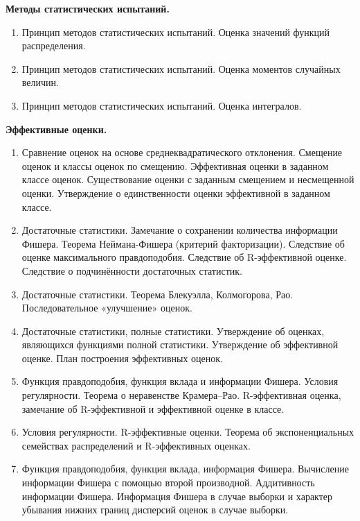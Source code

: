 \documentclass[a4paper,12pt]{article}
\newcommand{\theme}[1]{\hfil \textbf{#1} \hfil}
\begin{document}
\theme{Методы статистических испытаний.}
\begin{enumerate}[resume]
    \item \label{mc:cdf} Принцип методов статистических испытаний. Оценка значений функций распределения.
    \item \label{mc:mom} Принцип методов статистических испытаний. Оценка моментов случайных величин.
    \item \label{mc:int} Принцип методов статистических испытаний. Оценка интегралов.
\end{enumerate}

\theme{Эффективные оценки.}
\begin{enumerate}[resume]
    \item \label{eff:comp} Сравнение оценок на основе среднеквадратического отклонения. Смещение оценок и классы оценок по смещению. Эффективная оценки в заданном классе оценок. Существование оценки с заданным смещением и несмещенной оценки. Утверждение о единственности оценки эффективной в заданном классе.
    \item \label{eff:fact} Достаточные статистики. Замечание о сохранении количества информации Фишера. Теорема Неймана-Фишера (критерий факторизации). Следствие об оценке максимального правдоподобия. Следствие об R-эффективной оценке. Следствие о подчинённости достаточных статистик.
    \item \label{eff:BKR} Достаточные статистики. Теорема Блекуэлла, Колмогорова, Рао. Последовательное «улучшение» оценок.
    \item \label{eff:est} Достаточные статистики, полные статистики. Утверждение об оценках, являющихся функциями полной статистики. Утверждение об эффективной оценке. План построения эффективных оценок.
    \item \label{eff:CR} Функция правдоподобия, функция вклада и информации Фишера. Условия регулярности. Теорема о неравенстве Крамера--Рао. R-эффективная оценка, замечание об R-эффективной и эффективной оценке в классе.
    \item \label{eff:exp} Условия регулярности. R-эффективные оценки. Теорема об экспоненциальных семействах распределений и R-эффективных оценках.
    \item \label{eff:F} Функция правдоподобия, функция вклада, информация Фишера. Вычисление информации Фишера с помощью второй производной. Аддитивность информации Фишера. Информация Фишера в случае выборки и характер убывания нижних границ дисперсий оценок в случае выборки.
\end{enumerate}
\end{document}
